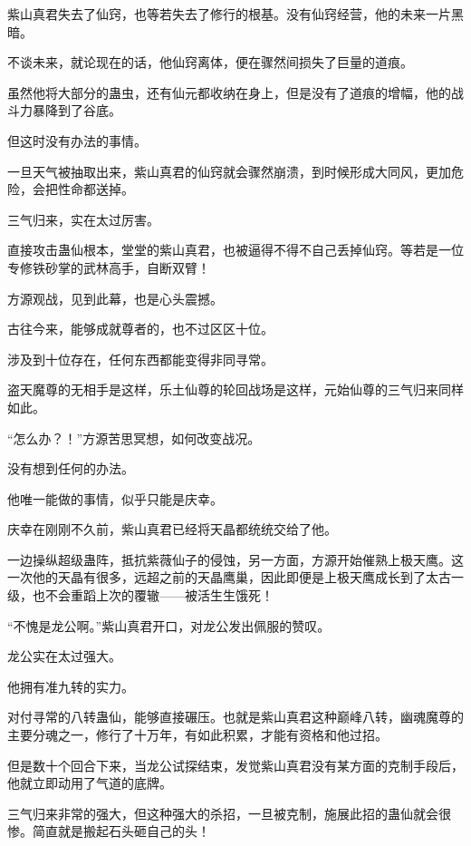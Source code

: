 
\begin{this_body}



紫山真君失去了仙窍，也等若失去了修行的根基。没有仙窍经营，他的未来一片黑暗。

不谈未来，就论现在的话，他仙窍离体，便在骤然间损失了巨量的道痕。

虽然他将大部分的蛊虫，还有仙元都收纳在身上，但是没有了道痕的增幅，他的战斗力暴降到了谷底。

但这时没有办法的事情。

一旦天气被抽取出来，紫山真君的仙窍就会骤然崩溃，到时候形成大同风，更加危险，会把性命都送掉。

三气归来，实在太过厉害。

直接攻击蛊仙根本，堂堂的紫山真君，也被逼得不得不自己丢掉仙窍。等若是一位专修铁砂掌的武林高手，自断双臂！

方源观战，见到此幕，也是心头震撼。

古往今来，能够成就尊者的，也不过区区十位。

涉及到十位存在，任何东西都能变得非同寻常。

盗天魔尊的无相手是这样，乐土仙尊的轮回战场是这样，元始仙尊的三气归来同样如此。

“怎么办？！”方源苦思冥想，如何改变战况。

没有想到任何的办法。

他唯一能做的事情，似乎只能是庆幸。

庆幸在刚刚不久前，紫山真君已经将天晶都统统交给了他。

一边操纵超级蛊阵，抵抗紫薇仙子的侵蚀，另一方面，方源开始催熟上极天鹰。这一次他的天晶有很多，远超之前的天晶鹰巢，因此即便是上极天鹰成长到了太古一级，也不会重蹈上次的覆辙——被活生生饿死！

“不愧是龙公啊。”紫山真君开口，对龙公发出佩服的赞叹。

龙公实在太过强大。

他拥有准九转的实力。

对付寻常的八转蛊仙，能够直接碾压。也就是紫山真君这种巅峰八转，幽魂魔尊的主要分魂之一，修行了十万年，有如此积累，才能有资格和他过招。

但是数十个回合下来，当龙公试探结束，发觉紫山真君没有某方面的克制手段后，他就立即动用了气道的底牌。

三气归来非常的强大，但这种强大的杀招，一旦被克制，施展此招的蛊仙就会很惨。简直就是搬起石头砸自己的头！


\end{this_body}

